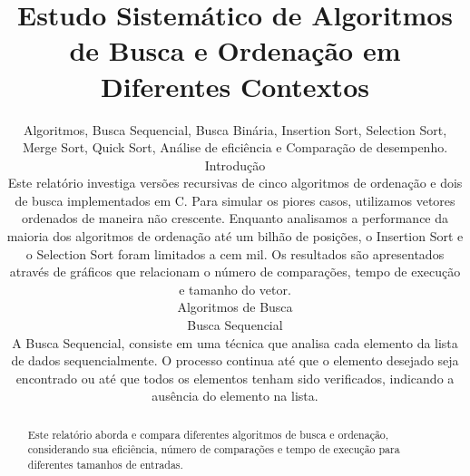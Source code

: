 \documentclass[conference]{IEEEtran}
\begin{document}
\title{Estudo Sistemático de Algoritmos de Busca e Ordenação em Diferentes Contextos}

\author{

\maketitle

\begin{abstract}
Este relatório aborda e compara diferentes algoritmos de busca e ordenação, considerando sua eficiência, número de comparações e tempo de execução para diferentes tamanhos de entradas.
\end{abstract}

\begin{IEEEkeywords}
Algoritmos, Busca Sequencial, Busca Binária, Insertion Sort, Selection Sort, Merge Sort, Quick Sort, Análise de eficiência e Comparação de desempenho.
\end{IEEEkeywords}

\section{Introdução}
Este relatório investiga versões recursivas de cinco algoritmos de ordenação e dois de busca implementados em C. Para simular os piores casos, utilizamos vetores ordenados de maneira não crescente. Enquanto analisamos a performance da maioria dos algoritmos de ordenação até um bilhão de posições, o Insertion Sort e o Selection Sort foram limitados a cem mil. Os resultados são apresentados através de gráficos que relacionam o número de comparações, tempo de execução e tamanho do vetor.

\section{Algoritmos de Busca}
\subsection{Busca Sequencial}
A Busca Sequencial, consiste em uma técnica que analisa cada elemento da lista de dados sequencialmente. O processo continua até que o elemento desejado seja encontrado ou até que todos os elementos tenham sido verificados, indicando a ausência do elemento na lista.

}
\end{document}
